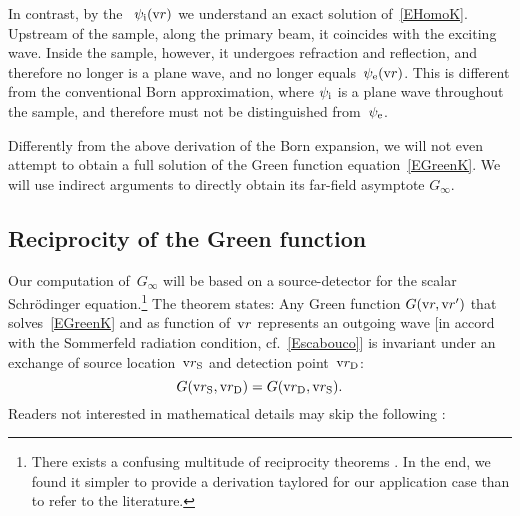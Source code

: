 In contrast, by the ~$\psi_{\text{i}}(\text{v}{r})$
%
%
%
we understand an exact solution of~\cref{EHomoK}.
Upstream of the sample, along the primary beam, it coincides with the exciting wave.
Inside the sample, however, it undergoes refraction and reflection,
and therefore no longer is a plane wave, and no longer equals~$\psi_{\text{e}}(\text{v}{r})$.
This is different from the conventional Born approximation,
where $\psi_{\text{i}}$ is a plane wave throughout the sample,
and therefore must not be distinguished from~$\psi_{\text{e}}$.

Differently from the above derivation of the Born expansion,
we will not even attempt to obtain a full solution
%
of the Green function equation~\cref{EGreenK}.
We will use indirect arguments to directly obtain its far-field asymptote $G_\infty$.

\subsection{Reciprocity of the Green function}\label{SReci}

Our computation of~$G_\infty$ will be based on a source-detector 
%
%
for the scalar Schrödinger equation.\footnote
{There exists a confusing multitude of reciprocity theorems \cite{Pot04}.
In the end, we found it simpler to provide a derivation taylored for our application case
than to refer to the literature.}
The theorem states:
Any Green function $G(\text{v}{r},\text{v}{r}')$
that solves~\cref{EGreenK} and as function of~$\text{v}{r}$ represents an outgoing wave
[in accord with the Sommerfeld radiation condition,
%
%
cf.~\cref{Escabouco}]
is invariant under an exchange of source location~$\text{v}{r}_\text{S}$ and detection point~$\text{v}{r}_\text{D}$:
%
%
\begin{equation}\label{Erecip}
  G(\text{v}{r}_\text{S},\text{v}{r}_\text{D}) = G(\text{v}{r}_\text{D},\text{v}{r}_\text{S}).
\end{equation}
Readers not interested in mathematical details may skip the following :

